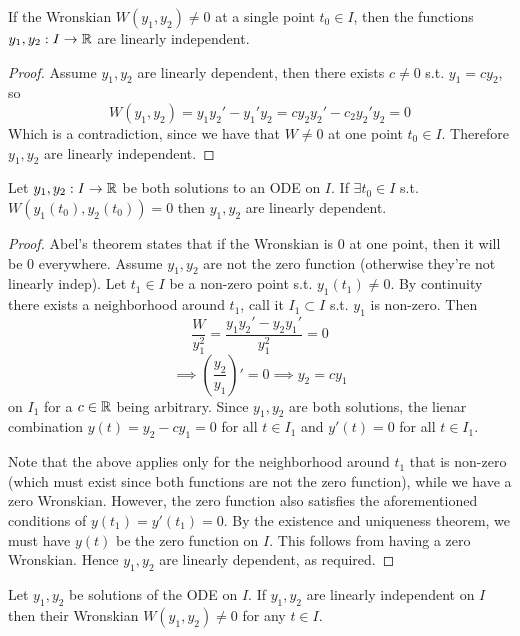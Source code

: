 \begin{theorem}
  If the Wronskian $W(y_1,y_2)\neq 0$ at a single point $t_0\in I$, then the functions
  $y_1,y_2:I\to\mathbb R$ are linearly independent.
\end{theorem}
\begin{proof}
  Assume $y_1,y_2$ are linearly dependent, then there exists $c\neq 0$ s.t. $y_1= cy_2$,
  so
  \[W(y_1,y_2) = y_1 y_2' - y_1' y_2 = cy_2 y_2' - c_2 y_2' y_2 = 0\]
  Which is a contradiction, since we have that $W\neq 0$ at one point $t_0\in I$.
  Therefore $y_1,y_2$ are linearly independent.
\end{proof}

\begin{theorem}
  Let $y_1,y_2:I\to\mathbb R$ be both solutions to an ODE on $I$. If $\exists t_0\in I$ s.t.
  $W(y_1(t_0), y_2(t_0))=0$ then $y_1,y_2$ are linearly dependent.
\end{theorem}
\begin{proof}
  Abel's theorem states that if the Wronskian is 0 at one point, then it will be 0
  everywhere. 
  Assume $y_1,y_2$ are not the zero function (otherwise they're not linearly indep). Let
  $t_1\in I$ be a non-zero point s.t. $y_1(t_1)\neq 0$. By continuity there exists a
  neighborhood around $t_1$, call it $I_1\subset I$ s.t. $y_1$ is non-zero. Then
  \[ \frac{W}{y_1^2} = \frac{y_1y_2' - y_2 y_1'}{y_1^2} = 0 \]
  \[\implies (\frac{y_2}{y_1})' = 0 \implies y_2 = c y_1\]
  on $I_1$ for a $c\in\mathbb R$ being arbitrary. Since $y_1,y_2$ are both solutions, the lienar
  combination $y(t) = y_2 -cy_1=0$ for all $t\in I_1$ and $y'(t)=0$ for all $t\in I_1$.

  Note that the above applies only for the neighborhood around $t_1$ that is non-zero
  (which must exist since both functions are not the zero function), while we have a zero
  Wronskian. However, the zero function also satisfies the aforementioned conditions of
  $y(t_1)=y'(t_1)=0$. By the existence and uniqueness theorem, we must have $y(t)$ be the
  zero function on $I$. This follows from having a zero Wronskian. Hence $y_1,y_2$ are
  linearly dependent, as required.
\end{proof}

\begin{cor}
  Let $y_1,y_2$ be solutions of the ODE on $I$. If $y_1,y_2$ are linearly independent on
  $I$ then their Wronskian $W(y_1,y_2)\neq 0$ for any $t\in I$.
\end{cor}



